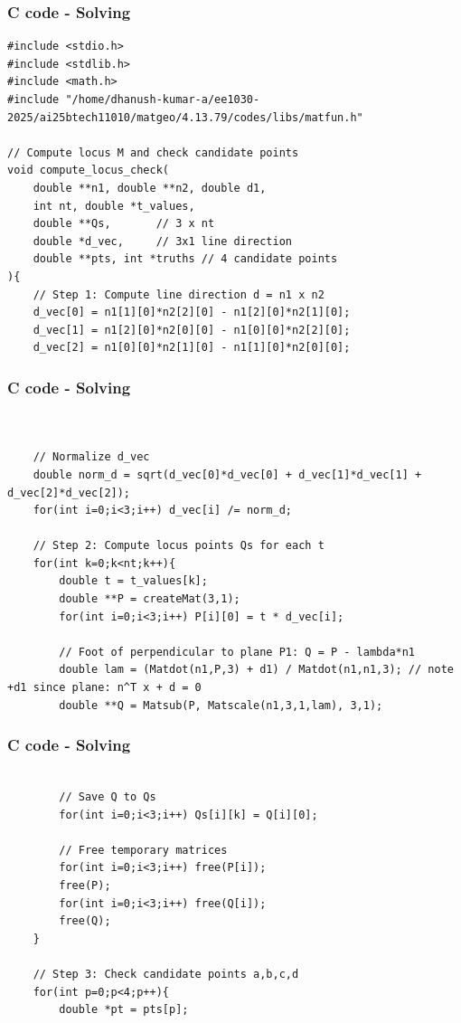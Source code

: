 \documentclass{beamer}
\begin{document}
\begin{frame}[fragile]                            
\frametitle{C code - Solving}                
\begin{lstlisting}
#include <stdio.h>
#include <stdlib.h>
#include <math.h>
#include "/home/dhanush-kumar-a/ee1030-2025/ai25btech11010/matgeo/4.13.79/codes/libs/matfun.h"

// Compute locus M and check candidate points
void compute_locus_check(
    double **n1, double **n2, double d1,
    int nt, double *t_values,
    double **Qs,       // 3 x nt
    double *d_vec,     // 3x1 line direction
    double **pts, int *truths // 4 candidate points
){
    // Step 1: Compute line direction d = n1 x n2
    d_vec[0] = n1[1][0]*n2[2][0] - n1[2][0]*n2[1][0];
    d_vec[1] = n1[2][0]*n2[0][0] - n1[0][0]*n2[2][0];
    d_vec[2] = n1[0][0]*n2[1][0] - n1[1][0]*n2[0][0];
\end{lstlisting}
\end{frame}
\begin{frame}[fragile]                            
\frametitle{C code - Solving}                
\begin{lstlisting}


    // Normalize d_vec
    double norm_d = sqrt(d_vec[0]*d_vec[0] + d_vec[1]*d_vec[1] + d_vec[2]*d_vec[2]);
    for(int i=0;i<3;i++) d_vec[i] /= norm_d;

    // Step 2: Compute locus points Qs for each t
    for(int k=0;k<nt;k++){
        double t = t_values[k];
        double **P = createMat(3,1);
        for(int i=0;i<3;i++) P[i][0] = t * d_vec[i];

        // Foot of perpendicular to plane P1: Q = P - lambda*n1
        double lam = (Matdot(n1,P,3) + d1) / Matdot(n1,n1,3); // note +d1 since plane: n^T x + d = 0
        double **Q = Matsub(P, Matscale(n1,3,1,lam), 3,1);
\end{lstlisting}
\end{frame}
\begin{frame}[fragile]                            
\frametitle{C code - Solving}                
\begin{lstlisting}

        // Save Q to Qs
        for(int i=0;i<3;i++) Qs[i][k] = Q[i][0];

        // Free temporary matrices
        for(int i=0;i<3;i++) free(P[i]);
        free(P);
        for(int i=0;i<3;i++) free(Q[i]);
        free(Q);
    }

    // Step 3: Check candidate points a,b,c,d
    for(int p=0;p<4;p++){
        double *pt = pts[p];
\end{lstlisting}
\end{frame}
\end{document}
